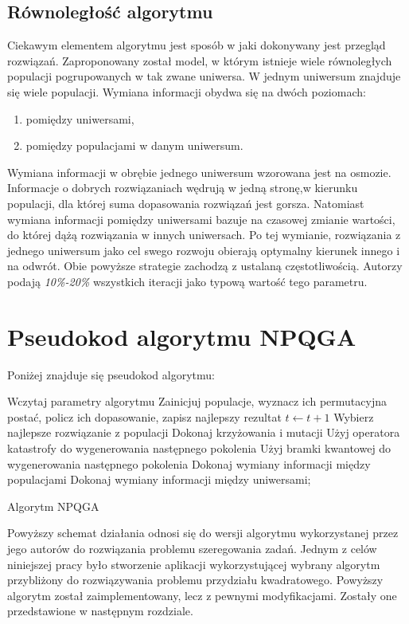 \subsection{Równoległość algorytmu}
Ciekawym elementem algorytmu jest sposób w jaki dokonywany jest przegląd rozwiązań. Zaproponowany został model, w którym istnieje wiele równoległych populacji pogrupowanych w tak zwane uniwersa. W jednym uniwersum znajduje się wiele populacji. Wymiana informacji obydwa się na dwóch poziomach:
\begin{enumerate}
\item pomiędzy uniwersami,
\item pomiędzy populacjami w danym uniwersum.
\end{enumerate}

Wymiana informacji w obrębie jednego uniwersum wzorowana jest na osmozie. Informacje o dobrych rozwiązaniach wędrują w jedną stronę,w kierunku populacji, dla której suma dopasowania rozwiązań jest gorsza. Natomiast wymiana informacji pomiędzy uniwersami bazuje na czasowej zmianie wartości, do której dążą rozwiązania w innych uniwersach. Po tej wymianie, rozwiązania z jednego uniwersum jako cel swego rozwoju obierają optymalny kierunek innego i na odwrót.
Obie powyższe strategie zachodzą z ustalaną częstotliwością. Autorzy podają \textit{10\%-20\%} wszystkich iteracji jako typową wartość tego parametru. 

\section{Pseudokod algorytmu NPQGA}
Poniżej znajduje się pseudokod algorytmu:
\newpage
\begin{algorithm}[H]
	Wczytaj parametry algorytmu\;
	Zainicjuj populacje, wyznacz ich permutacyjna postać, policz ich dopasowanie, zapisz najlepszy rezultat\;
 	{
 		$t\leftarrow t+1$\;
  		{
  			Wybierz najlepsze rozwiązanie z populacji\;
  			Dokonaj krzyżowania i mutacji\;
  			{
  				Użyj operatora katastrofy do wygenerowania następnego pokolenia\;
  			}
  			\Else
  			{
  				Użyj bramki kwantowej do wygenerowania następnego pokolenia\;
  			}
  		}
  		{
  			Dokonaj wymiany informacji między populacjami\;
  		}
  		{
  			Dokonaj wymiany informacji między uniwersami;
  		}
 	}
 	\caption{Algorytm NPQGA}
\end{algorithm}

Powyższy schemat działania odnosi się do wersji algorytmu wykorzystanej przez jego autorów do rozwiązania problemu szeregowania zadań. Jednym z celów niniejszej pracy było stworzenie aplikacji wykorzystującej wybrany algorytm przybliżony do rozwiązywania problemu przydziału kwadratowego. Powyższy algorytm został zaimplementowany, lecz z pewnymi modyfikacjami. Zostały one przedstawione w następnym rozdziale.